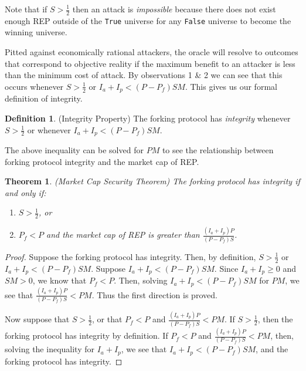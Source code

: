 \documentclass[floatfix,reprint,nofootinbib,amsmath,amssymb,epsfig,pre,floats,letterpaper,groupedaffiliation]{revtex4-1}
\newtheorem{theorem}{Theorem}
\theoremstyle{definition}
\theoremstyle{definition}
\newtheorem{definition}{Definition}
\begin{document}
Note that if $S > \frac{1}{2}$ then an attack is \textit{impossible} because there does not exist enough REP outside of the \texttt{True} universe for any \texttt{False} universe to become the winning universe.

Pitted against economically rational attackers, the oracle will resolve to outcomes that correspond to objective reality if the maximum benefit to an attacker is less than the minimum cost of attack. By observations 1 \& 2 we can see that this occurs whenever $S > \frac{1}{2}$ or $I_a + I_p < (P - P_f)SM$.  This gives us our formal definition of integrity.

\begin{definition}\label{ob:integrity_property}
(Integrity Property) The forking protocol has \textit{integrity} whenever $S > \frac{1}{2}$ or whenever $I_a + I_p < (P - P_f)SM$.
\end{definition}

The above inequality can be solved for $PM$ to see the relationship between forking protocol integrity and the market cap of REP.

\begin{theorem}\label{th:market_cap_security_theorem}
(Market Cap Security Theorem) The forking protocol has integrity if and only if:
\begin{enumerate}
\item $S > \frac{1}{2}$, or
\item $P_f < P$ and the market cap of REP is greater than $\frac{(I_a + I_p)P}{(P - P_f)S}$.
\end{enumerate}
\end{theorem}

\begin{proof}
Suppose the forking protocol has integrity.  Then, by definition, $S > \frac{1}{2}$ or $I_a + I_p < (P - P_f)SM$. Suppose $I_a + I_p < (P - P_f)SM$. Since $I_a + I_p \geq 0$ and $SM > 0$, we know that $P_f < P$.  Then, solving $I_a + I_p < (P - P_f)SM$ for $PM$, we see that $\frac{(I_a + I_p)P}{(P - P_f)S} < PM$.  Thus the first direction is proved.

Now suppose that $S > \frac{1}{2}$, or that $P_f < P$ and $\frac{(I_a + I_p)P}{(P - P_f)S} < PM$. If $S > \frac{1}{2}$, then the forking protocol has integrity by definition.  If $P_f < P$ and $\frac{(I_a + I_p)P}{(P - P_f)S} < PM$, then, solving the inequality for $I_a + I_p$, we see that $I_a + I_p < (P-P_f) SM$, and the forking protocol has integrity.
\end{proof}
\end{document}
